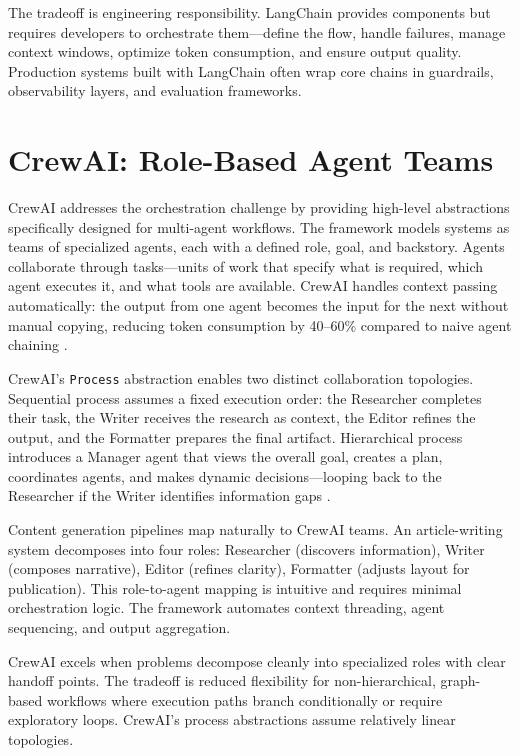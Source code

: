 The tradeoff is engineering responsibility. LangChain provides components but requires developers to orchestrate them---define the flow, handle failures, manage context windows, optimize token consumption, and ensure output quality. Production systems built with LangChain often wrap core chains in guardrails, observability layers, and evaluation frameworks.

\section{CrewAI: Role-Based Agent Teams}

CrewAI addresses the orchestration challenge by providing high-level abstractions specifically designed for multi-agent workflows. The framework models systems as teams of specialized agents, each with a defined role, goal, and backstory. Agents collaborate through tasks---units of work that specify what is required, which agent executes it, and what tools are available. CrewAI handles context passing automatically: the output from one agent becomes the input for the next without manual copying, reducing token consumption by 40--60\% compared to naive agent chaining \cite{CrewAI2024}.

CrewAI's \texttt{Process} abstraction enables two distinct collaboration topologies. Sequential process assumes a fixed execution order: the Researcher completes their task, the Writer receives the research as context, the Editor refines the output, and the Formatter prepares the final artifact. Hierarchical process introduces a Manager agent that views the overall goal, creates a plan, coordinates agents, and makes dynamic decisions---looping back to the Researcher if the Writer identifies information gaps \cite{Segal2026}.

Content generation pipelines map naturally to CrewAI teams. An article-writing system decomposes into four roles: Researcher (discovers information), Writer (composes narrative), Editor (refines clarity), Formatter (adjusts layout for publication). This role-to-agent mapping is intuitive and requires minimal orchestration logic. The framework automates context threading, agent sequencing, and output aggregation.

CrewAI excels when problems decompose cleanly into specialized roles with clear handoff points. The tradeoff is reduced flexibility for non-hierarchical, graph-based workflows where execution paths branch conditionally or require exploratory loops. CrewAI's process abstractions assume relatively linear topologies.

